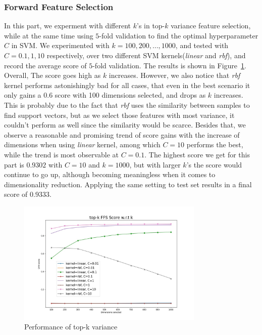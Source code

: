 \documentclass[journal]{IEEEtran}
\begin{document}
\subsubsection{Forward Feature Selection}
In this part, we experment with different $k$'s in top-$k$ variance feature selection, while at the same time using $5$-fold validation to find the optimal hyperparameter $C$ in SVM. We experimented with $k=100, 200, \ldots, 1000$, and tested with $C = 0.1, 1, 10$ respectively, over two different SVM kernels(\emph{linear} and \emph{rbf}), and record the average score of $5$-fold validation. The results is shown in Figure~\ref{fig:2}. Overall, The score goes high as $k$ increases. However, we also notice that \emph{rbf} kernel performs astonishingly bad for all cases, that even in the best scenario it only gains a 0.6 score with 100 dimensions selected, and drops as $k$ increases. This is probably due to the fact that \emph{rbf} uses the similarity between samples to find support vectors, but as we select those features with most variance, it couldn't perform as well since the similarity would be scarce. Besides that, we observe a reasonable and promising trend of score gains with the increase of dimensions when using \emph{linear} kernel, among which $C=10$ performs the best, while the trend is most observable at $C=0.1$. The highest score we get for this part is $0.9302$ with $C=10$ and $k=1000$, but with larger $k$'s the score would continue to go up, although becoming meaningless when it comes to dimensionality reduction. Applying the same setting to test set results in a final score of $0.9333$. 
\begin{figure}[htpb]
  \centering
  \includegraphics[width=3.5in]{figures/selection/ffs_result.jpg}
  \caption{Performance of top-k variance}
  \label{fig:2}
  \vspace{-3mm}
\end{figure}
\end{document}
